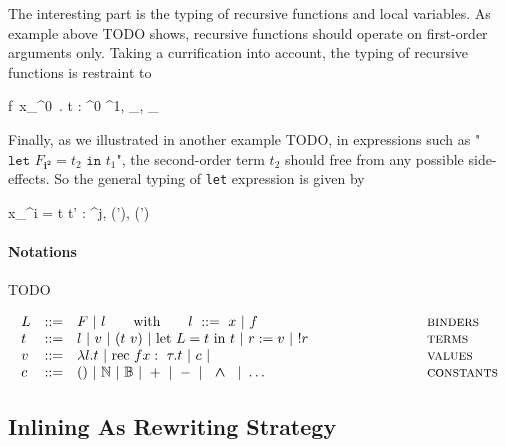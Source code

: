 \documentclass[a4paper,11pt,oneside]{article}
\theoremstyle{plain}
\newcommand{\bwedge}{\boldsymbol{~\wedge~}}
\newcommand{\bvee}{\boldsymbol{~\vee~}}
\begin{document}
The interesting part is the typing of recursive functions and local
variables.  As example above TODO shows, recursive functions should operate
on first-order arguments only. Taking a currification into account, the
typing of recursive functions is restraint to
	\begin{footnotesize}
		{\vdash {}  f~x_{\tau^0}~. t : 
			\tau^{0} \stackrel{\theta, \top_{\rho}}{\rightarrow}\tau^{1}, 
			\bot_{\theta}, 
			\bot_{\rho}}
	\end{footnotesize}
Finally, as we illustrated in another example TODO, in expressions such as 
"$\texttt{let } F_{\boldsymbol{i^{2}}} = t_2 \texttt{ in } t_1 $",
the second-order term $t_2$ should free from any possible side-effects.
So the general typing of \texttt{let} expression is given by
	\begin{footnotesize}
		\infrule[T$_{ML^{^2}}$-Let] 
			{\vdash t_1 : \tau^i, \theta, \rho 
			\qquad \vdash t' : \tau^j, \theta', \rho' 
			\qquad (i = 2) \Rightarrow 
			\boldsymbol{(\theta = \bot_{\theta}\bwedge \rho = \bot_{\rho})}} 
			{\vdash {} x_{\tau^i} = t \text{ in } t' 
				: \tau^{j}, 
				(\theta \bvee \theta'), 
				(\rho \bvee \rho')}
	\end{footnotesize}

\paragraph*{Notations}

TODO

\begin{displaymath}
	\begin{array}{lll@{\hspace*{3cm}}l}
			L &::=& F ~|~ l \qquad \text{with}\qquad l~::=~ x ~|~ f &
        \textsc{binders} \\ 
      t &::=& l ~|~ v~|~(t~v) ~|~\text{let } L = t 
         t ~|~ r := v ~|~ !r & 
        \textsc{terms}\\ 
      v &::=& \lambda l. t ~|~
        \text{rec } f x :~\tau . t ~|~ c ~|~ & 
        \textsc{values} \\ 
      c &::=&
        \text{()} ~|~ \mathbb{N}~|~\mathbb{B}~|~+~|~-~|~\bwedge~| ~\dots &
        \textsc{constants} \\
	\end{array}
\end{displaymath}


\subsection{Inlining As Rewriting Strategy}
\end{document}
